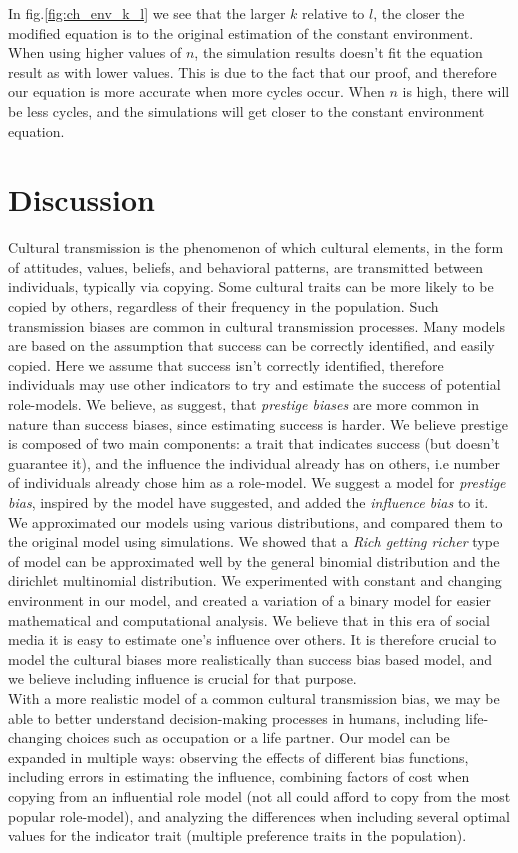 \documentclass[11pt]{article}
\begin{document}
In fig.\ref{fig:ch_env_k_l} we see that the larger $k$ relative to $l$, the closer the modified equation is to the original estimation of the constant environment. 
When using higher values of $n$, the simulation results doesn't fit the equation result as with lower values. This is due to the fact that our proof, and therefore our equation is more accurate when more cycles occur. When $n$ is high, there will be less cycles, and the simulations will get closer to the constant environment equation.

\section{Discussion}
Cultural transmission is the phenomenon of which cultural elements, in the form of attitudes, values, beliefs, and behavioral patterns, are transmitted between individuals, typically via copying.
Some cultural traits can be more likely to be copied by others, regardless of their frequency in the population.  
Such transmission biases are common in cultural transmission processes. 
Many models are based on the assumption that success can be correctly identified, and easily copied.
Here we assume that success isn't correctly identified, therefore individuals may use other indicators to try and estimate the success of potential role-models.
We believe, as \citet{complexityPaper} suggest, that \textit{prestige biases} are more common in nature than success biases, since estimating success is harder.
We believe prestige is composed of two main components: a trait that indicates success (but doesn't guarantee it), and the influence the individual already has on others, i.e number of individuals already chose him as a role-model.
We suggest a model for \textit{prestige bias}, inspired by the model \citet{evolutionBook} have suggested, and added the \textit{influence bias} to it.
We approximated our models using various distributions, and compared them to the original model using simulations.
We showed that a \textit{Rich getting richer} type of model can be approximated well by the general binomial distribution and the dirichlet multinomial distribution.
We experimented with constant and changing environment in our model, and created a variation of a binary model for easier mathematical and computational analysis.
We believe that in this era of social media it is easy to estimate one's influence over others.
It is therefore crucial to model the cultural biases more realistically than success bias based model, and we believe including influence is crucial for that purpose.\\
With a more realistic model of a common cultural transmission bias, we may be able to better understand decision-making processes in humans, including life-changing choices such as occupation or a life partner. 
Our model can be expanded in multiple ways: observing the effects of different bias functions, including errors in estimating the influence, combining factors of cost when copying from an influential role model (not all could afford to copy from the most popular role-model), and analyzing the differences when including several optimal values for the indicator trait (multiple preference traits in the population).
\end{document}
